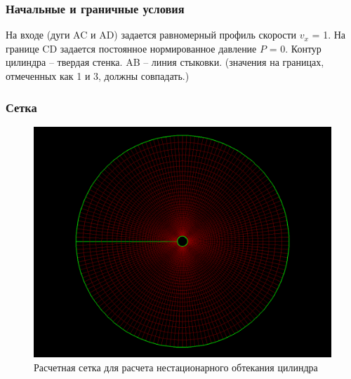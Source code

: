 \documentclass[12pt, a4paper]{article}
\begin{document}
\subsubsection{Начальные и граничные условия}
На входе (дуги AC и AD) задается равномерный профиль скорости $v_x$ = 1. На границе CD задается постоянное нормированное давление $P$ = 0. Контур цилиндра – твердая стенка. AB – линия стыковки. (значения на границах, отмеченных как 1 и 3, должны совпадать.)

\subsubsection{Сетка}
\begin{figure}[H]
    \centering
    \includegraphics[scale=0.5]{figure/Setka.png}
    \caption{Расчетная сетка для расчета нестационарного обтекания цилиндра}
    \label{fig:my_labe2}
\end{figure}
\end{document}
